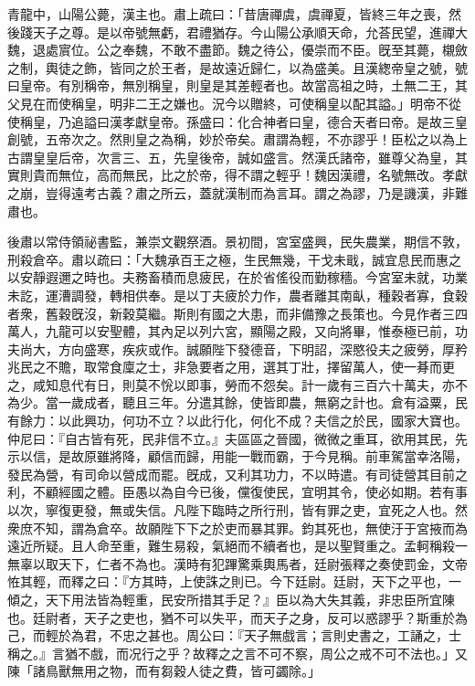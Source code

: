 \begin{pinyinscope}
青龍中，山陽公薨，漢主也。肅上疏曰：「昔唐禪虞，虞禪夏，皆終三年之喪，然後踐天子之尊。是以帝號無虧，君禮猶存。今山陽公承順天命，允荅民望，進禪大魏，退處賔位。公之奉魏，不敢不盡節。魏之待公，優崇而不臣。旣至其薨，櫬斂之制，輿徒之飾，皆同之於王者，是故遠近歸仁，以為盛美。且漢緫帝皇之號，號曰皇帝。有別稱帝，無別稱皇，則皇是其差輕者也。故當高祖之時，土無二王，其父見在而使稱皇，明非二王之嫌也。況今以贈終，可使稱皇以配其謚。」明帝不從使稱皇，乃追謚曰漢孝獻皇帝。孫盛曰：化合神者曰皇，德合天者曰帝。是故三皇創號，五帝次之。然則皇之為稱，妙於帝矣。肅謂為輕，不亦謬乎！臣松之以為上古謂皇皇后帝，次言三、五，先皇後帝，誠如盛言。然漢氏諸帝，雖尊父為皇，其實則貴而無位，高而無民，比之於帝，得不謂之輕乎！魏因漢禮，名號無改。孝獻之崩，豈得遠考古義？肅之所云，蓋就漢制而為言耳。謂之為謬，乃是譏漢，非難肅也。

後肅以常侍領祕書監，兼崇文觀祭酒。景初間，宮室盛興，民失農業，期信不敦，刑殺倉卒。肅以疏曰：「大魏承百王之極，生民無幾，干戈未戢，誠宜息民而惠之以安靜遐邇之時也。夫務畜積而息疲民，在於省傜役而勤稼穡。今宮室未就，功業未訖，運漕調發，轉相供奉。是以丁夫疲於力作，農者離其南畒，種穀者寡，食穀者衆，舊穀旣沒，新穀莫繼。斯則有國之大患，而非備豫之長策也。今見作者三四萬人，九龍可以安聖體，其內足以列六宮，顯陽之殿，又向將畢，惟泰極已前，功夫尚大，方向盛寒，疾疢或作。誠願陛下發德音，下明詔，深愍役夫之疲勞，厚矜兆民之不贍，取常食廩之士，非急要者之用，選其丁壯，擇留萬人，使一朞而更之，咸知息代有日，則莫不恱以即事，勞而不怨矣。計一歲有三百六十萬夫，亦不為少。當一歲成者，聽且三年。分遣其餘，使皆即農，無窮之計也。倉有溢粟，民有餘力：以此興功，何功不立？以此行化，何化不成？夫信之於民，國家大寶也。仲尼曰：『自古皆有死，民非信不立。』夫區區之晉國，微微之重耳，欲用其民，先示以信，是故原雖將降，顧信而歸，用能一戰而霸，于今見稱。前車駕當幸洛陽，發民為營，有司命以營成而罷。旣成，又利其功力，不以時遣。有司徒營其目前之利，不顧經國之體。臣愚以為自今已後，儻復使民，宜明其令，使必如期。若有事以次，寧復更發，無或失信。凡陛下臨時之所行刑，皆有罪之吏，宜死之人也。然衆庶不知，謂為倉卒。故願陛下下之於吏而暴其罪。鈞其死也，無使汙于宮掖而為遠近所疑。且人命至重，難生易殺，氣絕而不續者也，是以聖賢重之。孟軻稱殺一無辜以取天下，仁者不為也。漢時有犯蹕驚乘輿馬者，廷尉張釋之奏使罰金，文帝恠其輕，而釋之曰：『方其時，上使誅之則已。今下廷尉。廷尉，天下之平也，一傾之，天下用法皆為輕重，民安所措其手足？』臣以為大失其義，非忠臣所宜陳也。廷尉者，天子之吏也，猶不可以失平，而天子之身，反可以惑謬乎？斯重於為己，而輕於為君，不忠之甚也。周公曰：『天子無戲言；言則史書之，工誦之，士稱之。』言猶不戲，而况行之乎？故釋之之言不可不察，周公之戒不可不法也。」又陳「諸鳥獸無用之物，而有芻穀人徒之費，皆可蠲除。」


\end{pinyinscope}
